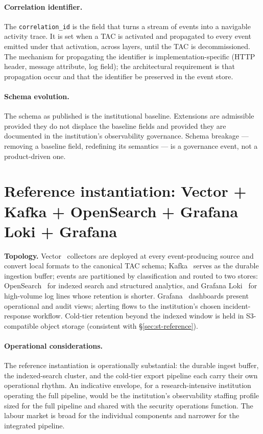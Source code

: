 \paragraph{Correlation identifier.} The \texttt{correlation\_id} is
the field that turns a stream of events into a navigable activity
trace. It is set when a TAC is activated and propagated to every
event emitted under that activation, across layers, until the TAC
is decommissioned. The mechanism for propagating the identifier is
implementation-specific (HTTP header, message attribute, log field);
the architectural requirement is that propagation occur and that
the identifier be preserved in the event store.

\paragraph{Schema evolution.} The schema as published is the
institutional baseline. Extensions are admissible provided they do
not displace the baseline fields and provided they are documented
in the institution's observability governance. Schema breakage ---
removing a baseline field, redefining its semantics --- is a
governance event, not a product-driven one.

\section{Reference instantiation: Vector + Kafka + OpenSearch + Grafana Loki + Grafana}
\label{sec:ob-reference}

\begin{instantiationbox}
\noindent\textbf{Topology.} Vector~\cite{vector-project} collectors
are deployed at every event-producing source and convert local
formats to the canonical TAC schema; Kafka~\cite{kafka} serves as
the durable ingestion buffer; events are partitioned by
classification and routed to two stores:
OpenSearch~\cite{opensearch} for indexed search and structured
analytics, and Grafana Loki~\cite{grafana-loki} for high-volume log
lines whose retention is shorter. Grafana~\cite{grafana} dashboards
present operational and audit views;
alerting flows to the institution's chosen incident-response
workflow. Cold-tier retention beyond the indexed window is held in
S3-compatible object storage (consistent with
\S\ref{sec:st-reference}).
\end{instantiationbox}

\paragraph{Operational considerations.} The reference instantiation
is operationally substantial: the durable ingest buffer, the
indexed-search cluster, and the cold-tier export pipeline each carry
their own operational rhythm. An indicative envelope, for a
research-intensive institution operating the full pipeline, would be
the institution's observability staffing profile sized for the full
pipeline and shared with the security operations
function. The labour market is broad for the individual components
and narrower for the integrated pipeline.

